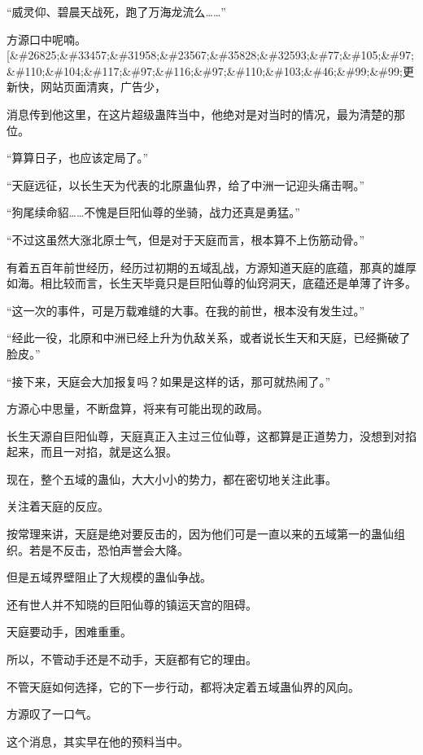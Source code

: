 
\begin{this_body}

“威灵仰、碧晨天战死，跑了万海龙流么……”

方源口中呢喃。[\&\#26825;\&\#33457;\&\#31958;\&\#23567;\&\#35828;\&\#32593;\&\#77;\&\#105;\&\#97;\&\#110;\&\#104;\&\#117;\&\#97;\&\#116;\&\#97;\&\#110;\&\#103;\&\#46;\&\#99;\&\#99;更新快，网站页面清爽，广告少，

消息传到他这里，在这片超级蛊阵当中，他绝对是对当时的情况，最为清楚的那位。

“算算日子，也应该定局了。”

“天庭远征，以长生天为代表的北原蛊仙界，给了中洲一记迎头痛击啊。”

“狗尾续命貂……不愧是巨阳仙尊的坐骑，战力还真是勇猛。”

“不过这虽然大涨北原士气，但是对于天庭而言，根本算不上伤筋动骨。”

有着五百年前世经历，经历过初期的五域乱战，方源知道天庭的底蕴，那真的雄厚如海。相比较而言，长生天毕竟只是巨阳仙尊的仙窍洞天，底蕴还是单薄了许多。

“这一次的事件，可是万载难缝的大事。在我的前世，根本没有发生过。”

“经此一役，北原和中洲已经上升为仇敌关系，或者说长生天和天庭，已经撕破了脸皮。”

“接下来，天庭会大加报复吗？如果是这样的话，那可就热闹了。”

方源心中思量，不断盘算，将来有可能出现的政局。

长生天源自巨阳仙尊，天庭真正入主过三位仙尊，这都算是正道势力，没想到对掐起来，而且一对掐，就是这么狠。

现在，整个五域的蛊仙，大大小小的势力，都在密切地关注此事。

关注着天庭的反应。

按常理来讲，天庭是绝对要反击的，因为他们可是一直以来的五域第一的蛊仙组织。若是不反击，恐怕声誉会大降。

但是五域界壁阻止了大规模的蛊仙争战。

还有世人并不知晓的巨阳仙尊的镇运天宫的阻碍。

天庭要动手，困难重重。

所以，不管动手还是不动手，天庭都有它的理由。

不管天庭如何选择，它的下一步行动，都将决定着五域蛊仙界的风向。

方源叹了一口气。

这个消息，其实早在他的预料当中。


\end{this_body}
